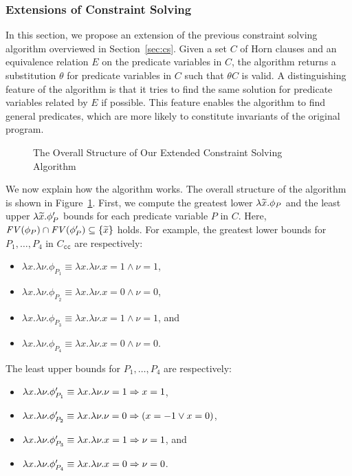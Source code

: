 \subsubsection{Extensions of Constraint Solving}
\label{sec:extcs}

In this section, we propose an extension of the previous constraint 
solving algorithm overviewed in Section~\ref{sec:cs}.  Given a set \(C\) 
of Horn clauses and an equivalence relation \(E\) on the predicate 
variables in \(C\), the algorithm returns a substitution \(\theta\) for 
predicate variables in \(C\) such that \(\theta C\) is valid.  A 
distinguishing feature of the algorithm is that it tries to find the 
same solution for predicate variables related by \(E\) if possible.  
This feature enables the algorithm to find general predicates, which are 
more likely to constitute invariants of the original program.

\begin{figure}
\todo{}
\caption{The Overall Structure of Our Extended Constraint Solving Algorithm}
\label{fig:extcs}
\end{figure}

We now explain how the algorithm works.  The overall structure of the 
algorithm is shown in Figure~\ref{fig:extcs}.  First, we compute the 
greatest lower \(\lambda \widetilde{x}.\phi_P\) and the least upper \(\lambda 
\widetilde{x}.\phi_P'\) bounds for each predicate variable \(P\) in \(C\).  
Here, \(\mathit{FV}({\phi_P}) \cap \mathit{FV}({\phi_P'}) \subseteq \{{\widetilde{x}}\}\) holds.  
For example, the greatest lower bounds for \(P_1,\dots,P_4\) in 
\(C_{\texttt{cc}}\) are respectively:
\begin{itemize}
\item \(\lambda x.\lambda \nu.\phi_{P_1}\equiv \lambda x.\lambda \nu.x=1 \land \nu=1\),
\item \(\lambda x.\lambda \nu.\phi_{P_2}\equiv \lambda x.\lambda \nu.x=0 \land \nu=0\),
\item \(\lambda x.\lambda \nu.\phi_{P_3}\equiv \lambda x.\lambda \nu.x=1 \land \nu=1\), and
\item \(\lambda x.\lambda \nu.\phi_{P_4}\equiv \lambda x.\lambda \nu.x=0 \land \nu=0\).
\end{itemize}
The least upper bounds for \(P_1,\dots,P_4\) are respectively:
\begin{itemize}
\item \(\lambda x.\lambda \nu.\phi_{P_1}'\equiv \lambda x.\lambda \nu.\nu=1 \Rightarrow x=1\),
\item \(\lambda x.\lambda \nu.\phi_{P_2}'\equiv \lambda x.\lambda \nu.\nu=0 \Rightarrow (x=-1 \lor x=0)\),
\item \(\lambda x.\lambda \nu.\phi_{P_3}'\equiv \lambda x.\lambda \nu.x=1 \Rightarrow \nu=1\), and
\item \(\lambda x.\lambda \nu.\phi_{P_4}'\equiv \lambda x.\lambda \nu.x=0 \Rightarrow \nu=0\).
\end{itemize}

